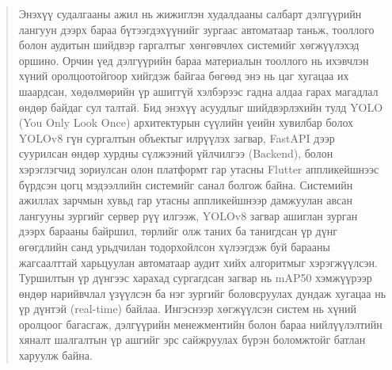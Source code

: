 \begin{abstract}
Энэхүү судалгааны ажил нь жижиглэн худалдааны салбарт дэлгүүрийн лангуун дээрх бараа бүтээгдэхүүнийг зургаас автоматаар таньж, тооллого болон аудитын шийдвэр гаргалтыг хөнгөвчлөх системийг хөгжүүлэхэд оршино. Орчин үед дэлгүүрийн бараа материалын тооллого нь ихэвчлэн хүний оролцоотойгоор хийгдэж байгаа бөгөөд энэ нь цаг хугацаа их шаардсан, хөдөлмөрийн үр ашиггүй хэлбэрээс гадна алдаа гарах магадлал өндөр байдаг сул талтай. Бид энэхүү асуудлыг шийдвэрлэхийн тулд YOLO (You Only Look Once) архитектурын сүүлийн үеийн хувилбар болох YOLOv8 гүн сургалтын объектыг илрүүлэх загвар, FastAPI дээр суурилсан өндөр хурдны сүлжээний үйлчилгээ (Backend), болон хэрэглэгчид зориулсан олон платформт гар утасны Flutter аппликейшнээс бүрдсэн цогц мэдээллийн системийг санал болгож байна. Системийн ажиллах зарчмын хувьд гар утасны аппликейшнээр дамжуулан авсан лангууны зургийг сервер рүү илгээж, YOLOv8 загвар ашиглан зурган дээрх барааны байршил, төрлийг олж таних ба танигдсан үр дүнг өгөгдлийн санд урьдчилан тодорхойлсон хүлээгдэж буй барааны жагсаалттай харьцуулан автоматаар аудит хийх алгоритмыг хэрэгжүүлсэн. Туршилтын үр дүнгээс харахад сургагдсан загвар нь mAP50 хэмжүүрээр өндөр нарийвчлал үзүүлсэн ба нэг зургийг боловсруулах дундаж хугацаа нь үр дүнтэй (real-time) байлаа. Ингэснээр хөгжүүлсэн систем нь хүний оролцоог багасгаж, дэлгүүрийн менежментийн болон бараа нийлүүлэлтийн хяналт шалгалтын үр ашгийг эрс сайжруулах бүрэн боломжтойг батлан харуулж байна.
\end{abstract}
